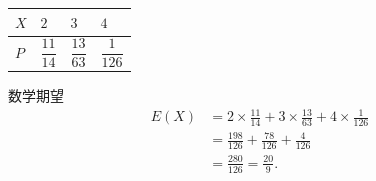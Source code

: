\begin{answer}
\begin{center}
\begin{tabular}{llll}
\toprule
$X$ & $2$ & $3$ & $4$ \\
\midrule
$P$ & $\dfrac{11}{14}$ & $\dfrac{13}{63}$ & $\dfrac1{126}$ \\
\bottomrule
\end{tabular}
\end{center}

数学期望
\nopagebreak[4]
\[\begin{aligned}
E(X)&=2\times\frac{11}{14}+3\times\frac{13}{63}+4\times\frac1{126}\\
&=\frac{198}{126}+\frac{78}{126}+\frac4{126}\\
&=\frac{280}{126}=\frac{20}9.
\end{aligned}\]



\end{answer}
